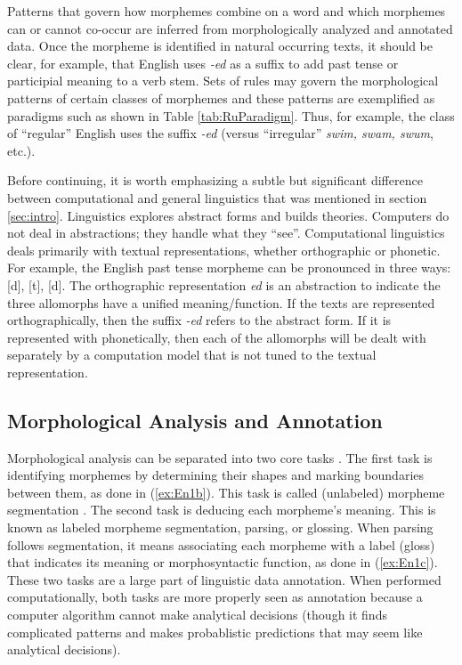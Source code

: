 \documentclass[12pt]{article}
\begin{document}
Patterns that govern how morphemes combine on a word and which morphemes can or cannot co-occur are inferred from morphologically analyzed and annotated data. Once the morpheme is identified in natural occurring texts, it should be clear, for example, that English uses \textit{-ed} as a suffix to add past tense or participial meaning to a verb stem. Sets of rules may govern the morphological patterns of certain classes of morphemes and these patterns are exemplified as paradigms such as shown in Table \ref{tab:RuParadigm}. Thus, for example, the class of ``regular'' English uses the suffix \textit{-ed} (versus ``irregular'' \textit{swim, swam, swum}, etc.).

Before continuing, it is worth emphasizing a subtle but significant difference between computational and general linguistics that was mentioned in section \ref{sec:intro}. Linguistics explores abstract forms and builds theories. Computers do not deal in abstractions; they handle what they ``see''. Computational linguistics deals primarily with textual representations, whether orthographic or phonetic. For example, the English past tense morpheme can be pronounced in three ways: [d], [t], [{\textbari}d]. The orthographic representation \textit{ed} is an abstraction to indicate the three allomorphs have a unified meaning/function. If the texts are represented orthographically, then the suffix \textit{-ed} refers to the abstract form. If it is represented with phonetically, then each of the allomorphs will be dealt with separately by a computation model that is not tuned to the textual representation. 

\subsection{Morphological Analysis and Annotation}
\label{analysis}

Morphological analysis can be separated into two core tasks \cite{cotterell_labeled_2015,hammarstrom_unsupervised_2011,nicolai_morphological_2017,palmer_semi-automated_2009}. The first task is identifying morphemes by determining their shapes and marking boundaries between them, as done in (\ref{ex:En1b}). This task is called (unlabeled) morpheme segmentation \cite{creutz_unsupervised_2007,snyder_unsupervised_2008}. The second task is deducing each morpheme's meaning. This is known as labeled morpheme segmentation, parsing, or glossing. When parsing follows segmentation, it means associating each morpheme with a label (gloss) that indicates its meaning or morphosyntactic function, as done in (\ref{ex:En1c}). 
These two tasks are a large part of linguistic data annotation. When performed computationally, both tasks are more properly seen as annotation because a computer algorithm cannot make analytical decisions (though it finds complicated patterns and makes probablistic predictions that may seem like analytical decisions).
\end{document}
